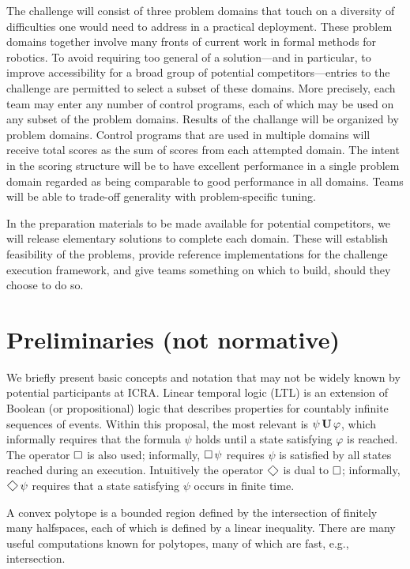 \documentclass{amsart}
\theoremstyle{definition}
\begin{document}
The challenge will consist of three problem domains that touch on a diversity of
difficulties one would need to address in a practical deployment.  These problem
domains together involve many fronts of current work in formal methods for
robotics.  To avoid requiring too general of a solution---and in particular, to
improve accessibility for a broad group of potential competitors---entries to
the challenge are permitted to select a subset of these domains.  More
precisely, each team may enter any number of control programs, each of which may
be used on any subset of the problem domains.  Results of the challange will be
organized by problem domains.  Control programs that are used in multiple
domains will receive total scores as the sum of scores from each attempted
domain.  The intent in the scoring structure will be to have excellent
performance in a single problem domain regarded as being comparable to good
performance in all domains.  Teams will be able to trade-off generality with
problem-specific tuning.

In the preparation materials to be made available for potential competitors, we
will release elementary solutions to complete each domain.  These will establish
feasibility of the problems, provide reference implementations for the challenge
execution framework, and give teams something on which to build, should they
choose to do so.


\section{Preliminaries (not normative)}

We briefly present basic concepts and notation that may not be widely known by
potential participants at ICRA.  Linear temporal logic (LTL) is an extension of
Boolean (or propositional) logic that describes properties for countably
infinite sequences of events.  Within this proposal, the most relevant is $\psi
\operatorname{\mathbf{U}} \varphi$, which informally requires that the formula $\psi$ holds until
a state satisfying $\varphi$ is reached.  The operator $\operatorname{\Box}$ is also used;
informally, $\operatorname{\Box} \psi$ requires $\psi$ is satisfied by all states reached
during an execution.  Intuitively the operator $\Feventually$ is dual to
$\operatorname{\Box}$; informally, $\Feventually \psi$ requires that a state satisfying
$\psi$ occurs in finite time.

A convex polytope is a bounded region defined by the intersection of finitely
many halfspaces, each of which is defined by a linear inequality.  There are
many useful computations known for polytopes, many of which are fast, e.g.,
intersection. \cite{Fukuda2004}
\end{document}
